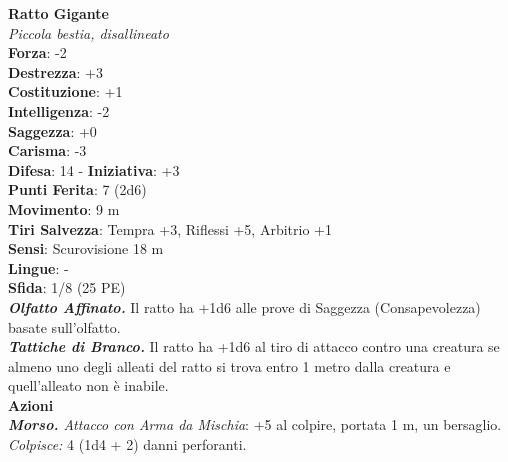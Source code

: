 \begin{multicols}{2}
\medskip\textbf{Ratto Gigante}\\
\emph{Piccola bestia, disallineato}\\
\textbf{Forza}: -2\\
\textbf{Destrezza}: +3\\
\textbf{Costituzione}: +1\\
\textbf{Intelligenza}: -2\\
\textbf{Saggezza}: +0\\
\textbf{Carisma}: -3\\
\textbf{Difesa}: 14 - \textbf{Iniziativa}: +3\\
\textbf{Punti Ferita}: 7 (2d6)\\
\textbf{Movimento}: 9 m\\
\textbf{Tiri Salvezza}: Tempra +3, Riflessi +5, Arbitrio +1 \\
\textbf{Sensi}: Scurovisione 18 m\\
\textbf{Lingue}: -\\
\textbf{Sfida}: 1/8 (25 PE)\smallskip\\
\emph{\textbf{Olfatto Affinato.}} Il ratto ha +1d6 alle prove di Saggezza (Consapevolezza) basate sull'olfatto.\\
\emph{\textbf{Tattiche di Branco.}} Il ratto ha +1d6 al tiro di attacco contro una creatura se almeno uno degli alleati del ratto si trova entro 1 metro dalla creatura e quell'alleato non è inabile. \\
\smallskip\textbf{Azioni}\\
\emph{\textbf{Morso.} Attacco con Arma da Mischia}: +5 al colpire, portata 1 m, un bersaglio.\\
\emph{Colpisce:} 4 (1d4 + 2) danni perforanti.\\


\end{multicols}
